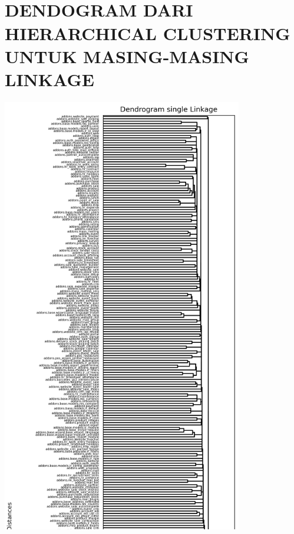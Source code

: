 \renewcommand{\thesection}{}
\renewcommand{\thesubsection}{\arabic{section}.\arabic{subsection}}
\makeatletter
\def\@seccntformat#1{\csname #1ignore\expandafter\endcsname\csname the#1\endcsname\quad}
\let\sectionignore\@gobbletwo
\let\latex@numberline\numberline
\def\numberline#1{\if\relax#1\relax\else\latex@numberline{#1}\fi}
\makeatother

\chapter{\\ DENDOGRAM DARI HIERARCHICAL CLUSTERING UNTUK MASING-MASING LINKAGE}
\begin{center}
  \includegraphics[width=10.5cm]{img/lampiran/single-full-1.png}
  \label{fig:single-full-1}
\end{center}
